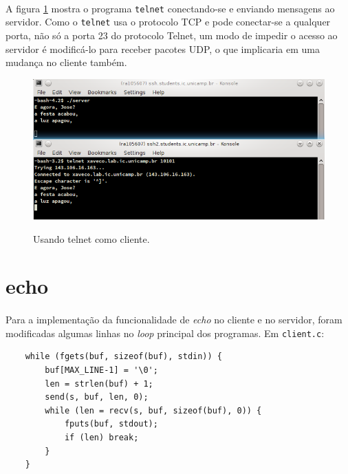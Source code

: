 \documentclass[a4paper,10pt,oneside,final,titlepage,onecolumn]{article}
\begin{document}
\paragraph{}A figura \ref{telnet} mostra o programa \verb|telnet| conectando-se e enviando mensagens ao servidor. Como o \verb|telnet| usa o protocolo TCP e pode conectar-se a qualquer porta, não só a porta 23 do protocolo Telnet, um modo de impedir o acesso ao servidor é modificá-lo para receber pacotes UDP, o que implicaria em uma mudança no cliente também.
\begin{figure}[!ht]
  \caption{Usando telnet como cliente.}
  \centering
  \includegraphics[width=117mm]{images/telnet.png}
  \label{telnet}
\end{figure}



\FloatBarrier
\section{echo}
\paragraph{}Para a implementação da funcionalidade de \emph{echo} no cliente e no servidor, foram modificadas algumas linhas no \emph{loop} principal dos programas. Em \verb|client.c|:
\begin{lstlisting}
	while (fgets(buf, sizeof(buf), stdin)) {
		buf[MAX_LINE-1] = '\0';
		len = strlen(buf) + 1;
		send(s, buf, len, 0);
		while (len = recv(s, buf, sizeof(buf), 0)) {
			fputs(buf, stdout);
			if (len) break;
		}
	}
\end{lstlisting}
\end{document}
